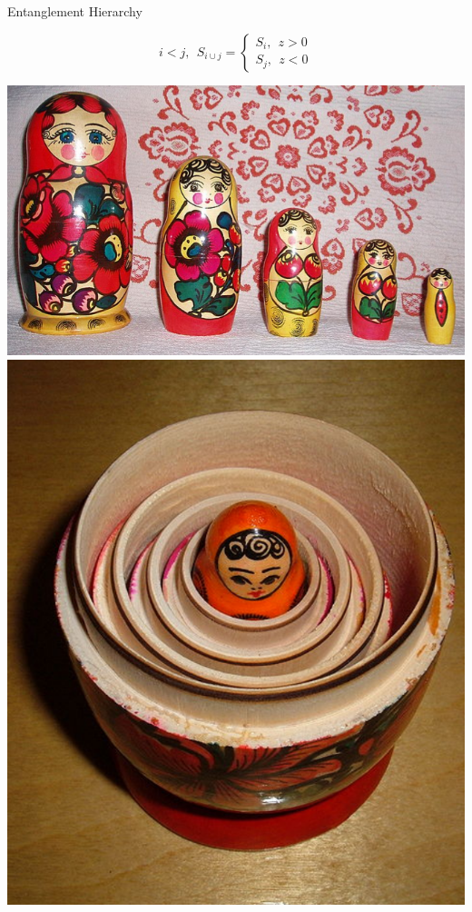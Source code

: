 \documentclass[12pt,aspectratio=169]{beamer}
\begin{document}
\begin{frame}{Entanglement Hierarchy}
\begin{minipage}{0.5\textwidth}
\[i < j, ~ ~ S_{i\cup j} =
	\begin{cases}
	S_{i}, ~ ~ z > 0\\
	S_{j}, ~ ~ z < 0
	\end{cases}
\]
\end{minipage}
\begin{minipage}{0.45\textwidth}
\includegraphics[height=0.3\textheight]{figures/Matroshka.png}
\includegraphics[height=0.3\textheight]{figures/nested.png}
\end{minipage}


\end{frame}
\end{document}
